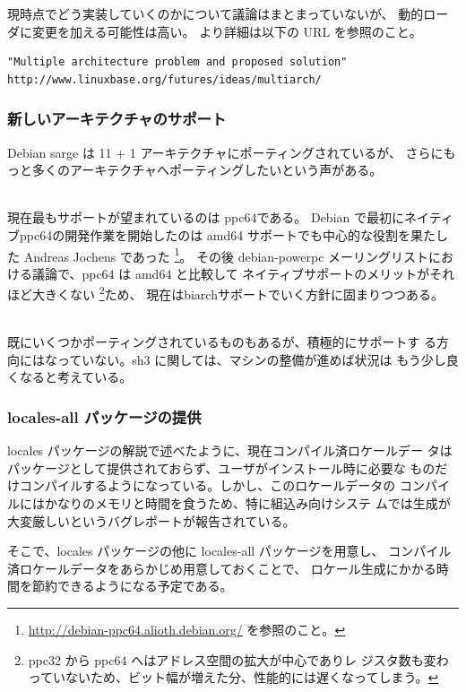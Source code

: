 \documentclass[mingoth,a4paper]{jsarticle}
\newcommand{\subsubsubsection}[1]{%
\vspace{1zw}{\bf #1}\\}
\begin{document}
    現時点でどう実装していくのかについて議論はまとまっていないが、
    動的ローダに変更を加える可能性は高い。
    より詳細は以下の URL を参照のこと。

\begin{Verbatim}[frame=single]
"Multiple architecture problem and proposed solution"
http://www.linuxbase.org/futures/ideas/multiarch/
\end{Verbatim}

  \subsubsection{新しいアーキテクチャのサポート}

    Debian sarge は 11 + 1 アーキテクチャにポーティングされているが、
    さらにもっと多くのアーキテクチャへポーティングしたいという声がある。

    \subsubsubsection{ppc64}

      現在最もサポートが望まれているのは ppc64である。
      Debian で最初にネイティブppc64の開発作業を開始したのは
      amd64 サポートでも中心的な役割を果たした Andreas Jochens であった
      \footnote{\url{http://debian-ppc64.alioth.debian.org/} を参照のこと。}。
      その後 debian-powerpc メーリングリストにおける議論で、ppc64 は amd64 と比較して
      ネイティブサポートのメリットがそれほど大きくない
      \footnote{ppc32 から ppc64 へはアドレス空間の拡大が中心でありレ
      ジスタ数も変わっていないため、ビット幅が増えた分、性能的には遅くなってしまう。}ため、
	    現在はbiarchサポートでいく方針に固まりつつある。

    \subsubsubsection{sh3, m32r, mips64, parisc64}

      既にいくつかポーティングされているものもあるが、積極的にサポートす
      る方向にはなっていない。sh3 に関しては、マシンの整備が進めば状況は
      もう少し良くなると考えている。

  \subsubsection{locales-all パッケージの提供}

    locales パッケージの解説で述べたように、現在コンパイル済ロケールデー
    タはパッケージとして提供されておらず、ユーザがインストール時に必要な
    ものだけコンパイルするようになっている。しかし、このロケールデータの
    コンパイルにはかなりのメモリと時間を食うため、特に組込み向けシステ
    ムでは生成が大変厳しいというバグレポートが報告されている。

    そこで、locales パッケージの他に locales-all パッケージを用意し、
    コンパイル済ロケールデータをあらかじめ用意しておくことで、
    ロケール生成にかかる時間を節約できるようになる予定である。
\end{document}
